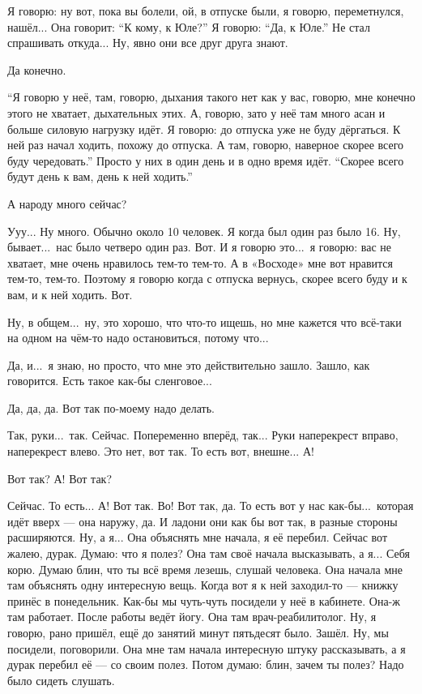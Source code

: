 \I
Я говорю: ну вот, пока вы болели, ой, в отпуске были, я говорю, переметнулся, нашёл...
Она говорит: ``К кому, к Юле?''
Я говорю: ``Да, к Юле.''
Не стал спрашивать откуда...
Ну, явно они все друг друга знают.

\M
Да конечно.

\I
``Я говорю у неё, там, говорю, дыхания такого нет как у вас, говорю, мне конечно этого не
хватает, дыхательных этих.
А, говорю, зато у неё там много асан и больше
силовую нагрузку идёт. Я говорю: до отпуска уже не буду дёргаться.
К ней раз начал ходить, похожу до отпуска. А там, говорю, наверное скорее всего
буду чередовать.''
Просто у них в один день и в одно время идёт.
``Скорее всего будут день к вам, день к ней ходить.''

\M
А народу много сейчас?

\I
Ууу... Ну много. Обычно около 10 человек.
Я когда был один раз было 16.
Ну, бывает...\ нас было четверо один раз.
Вот. И я говорю это...\ я говорю: вас не хватает, мне очень нравилось тем-то тем-то.
А в «Восходе» мне вот нравится тем-то, тем-то. Поэтому я говорю когда
с отпуска вернусь,
скорее всего буду и к вам, и к ней ходить. Вот.

\M
Ну, в общем...\ ну, это хорошо, что что-то ищешь, но мне кажется что всё-таки на одном
на чём-то надо остановиться, потому что...

\I
Да, и...\ я знаю, но просто, что мне это действительно зашло.
Зашло, как говорится.
Есть такое как-бы сленговое...

\M
Да, да, да.
Вот так по-моему надо делать.

\I
Так, руки...\ так. Сейчас. Попеременно вперёд, так...
Руки наперекрест вправо, наперекрест влево. Это нет, вот так.
То есть вот, внешне... А!

\M
Вот так? А! Вот так?

\I
Сейчас.
То есть...
А! Вот так. Во! Вот
так, да. То есть вот у нас как-бы...\ которая идёт вверх --- она наружу, да.
И ладони они как бы вот так, в разные стороны расширяются.
Ну, а я... Она объяснять мне начала, я её перебил. Сейчас вот жалею, дурак.
Думаю: что я полез? Она там своё начала высказывать, а я... Себя корю.
Думаю блин, что ты всё время лезешь, слушай человека. Она начала мне там объяснять одну
интересную вещь. Когда вот я к ней заходил-то --- книжку принёс в понедельник.
Как-бы мы чуть-чуть посидели у неё в кабинете. Она-ж там работает. После работы
ведёт йогу. Она там врач-реабилитолог. Ну, я говорю, рано пришёл, ещё до занятий
минут пятьдесят было. Зашёл. Ну, мы посидели, поговорили. Она мне там начала интересную штуку
рассказывать, а я дурак перебил её --- со своим полез. Потом думаю: блин, зачем ты полез?
Надо было сидеть слушать.

